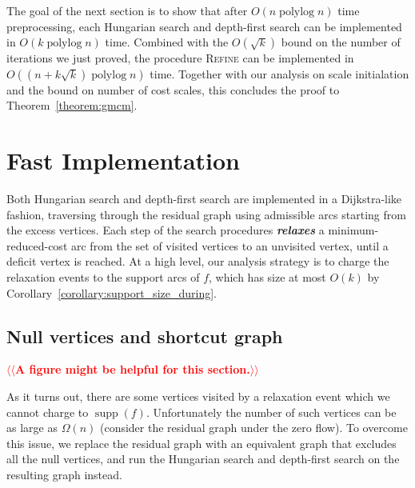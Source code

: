 \documentclass[a4paper,UKenglish]{socg-lipics-v2018}
\makeatletter
\def\note#1{\textcolor{red}{{#1}}}
\def\polylog{\mathop{\mathrm{polylog}}}
\def\supp{\operatorname{supp}}
\theoremstyle{plain}
\numberwithin{figure}{section}
\def\EMPH#1{\textbf{\emph{\boldmath #1}}}
\def\n@te#1{\textsf{\boldmath \textbf{$\langle\!\langle$#1$\rangle\!\rangle$}}\leavevmode}
\def\note#1{\textcolor{red}{\n@te{#1}}}
\makeatother
\begin{document}

The goal of the next section is to show that after $O(n \polylog n)$ time preprocessing, each Hungarian search and depth-first search can be implemented in $O(k \polylog n)$ time.
%
Combined with the $O(\sqrt{k})$ bound on the number of iterations we just proved, the procedure \textsc{Refine} can be implemented in $O((n+k\sqrt{k}) \polylog n)$ time.  Together with our analysis on scale initialation and the bound on number of cost scales, this concludes the proof to Theorem~\ref{theorem:gmcm}.



\section{Fast Implementation}
\label{S:implementation}

Both Hungarian search and depth-first search are implemented in a Dijkstra-like fashion, traversing through the residual graph using admissible arcs starting from the excess vertices.
Each step of the search procedures \EMPH{relaxes} a minimum-reduced-cost arc from the set of visited vertices to an unvisited vertex, until a deficit vertex is reached.
%
At a high level, our analysis strategy is to charge the relaxation events to the support arcs of $f$, which has size at most $O(k)$ by Corollary~\ref{corollary:support_size_during}.

\subsection{Null vertices and shortcut graph}

\note{A figure might be helpful for this section.}

As it turns out, there are some vertices visited by a relaxation event which we cannot charge to $\supp(f)$.
Unfortunately the number of such vertices can be as large as $\Omega(n)$
(consider the residual graph under the zero flow).
%
To overcome this issue, we replace the residual graph with an equivalent graph that excludes all the null vertices,
and run the Hungarian search and depth-first search on the resulting graph instead.
\end{document}
